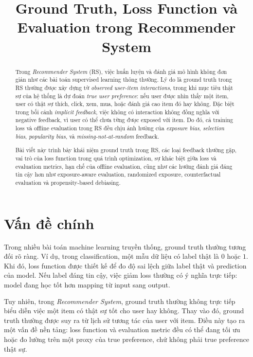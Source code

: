 \documentclass[12pt,a4paper]{article}
\title{\textbf{Ground Truth, Loss Function và Evaluation trong Recommender System}}
\author{}
\date{}
\begin{document}
\maketitle

\begin{abstract}
Trong \textit{Recommender System} (RS), việc huấn luyện và đánh giá mô hình không đơn giản như các bài toán supervised learning thông thường. Lý do là ground truth trong RS thường được xây dựng từ \textit{observed user-item interactions}, trong khi mục tiêu thật sự của hệ thống là dự đoán \textit{true user preference}: nếu user được nhìn thấy một item, user có thật sự thích, click, xem, mua, hoặc đánh giá cao item đó hay không. Đặc biệt trong bối cảnh \textit{implicit feedback}, việc không có interaction không đồng nghĩa với negative feedback, vì user có thể chưa từng được exposed với item. Do đó, cả training loss và offline evaluation trong RS đều chịu ảnh hưởng của \textit{exposure bias}, \textit{selection bias}, \textit{popularity bias}, và \textit{missing-not-at-random} feedback.

Bài viết này trình bày khái niệm ground truth trong RS, các loại feedback thường gặp, vai trò của loss function trong quá trình optimization, sự khác biệt giữa loss và evaluation metrics, hạn chế của offline evaluation, cũng như các hướng đánh giá đáng tin cậy hơn như exposure-aware evaluation, randomized exposure, counterfactual evaluation và propensity-based debiasing.
\end{abstract}

\section{Vấn đề chính}

Trong nhiều bài toán machine learning truyền thống, ground truth thường tương đối rõ ràng. Ví dụ, trong classification, một mẫu dữ liệu có label thật là $0$ hoặc $1$. Khi đó, loss function được thiết kế để đo độ sai lệch giữa label thật và prediction của model. Nếu label đáng tin cậy, việc giảm loss thường có ý nghĩa trực tiếp: model đang học tốt hơn mapping từ input sang output.

Tuy nhiên, trong \textit{Recommender System}, ground truth thường không trực tiếp biểu diễn việc một item có thật sự tốt cho user hay không. Thay vào đó, ground truth thường được suy ra từ lịch sử tương tác của user với item. Điều này tạo ra một vấn đề nền tảng: loss function và evaluation metric đều có thể đang tối ưu hoặc đo lường trên một proxy của true preference, chứ không phải true preference thật sự.
\end{document}

